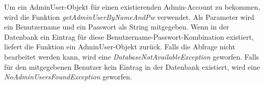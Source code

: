 

Um ein AdminUser-Objekt für einen existierenden Admin-Account zu bekommen, wird die Funktion \emph{getAdminUserByNameAndPw} verwendet. Als Parameter wird ein Benutzername und ein Passwort als String mitgegeben. Wenn in der Datenbank ein Eintrag für diese Benutzername-Passwort-Kombination existiert, liefert die Funktion ein AdminUser-Objekt zurück. Falls die Abfrage nicht bearbeitet werden kann, wird eine \emph{DatabaseNotAvailableException} geworfen. Falls für den mitgegebenen Benutzer kein Eintrag in der Datenbank existiert, wird eine \emph {NoAdminUsersFoundException} geworfen.